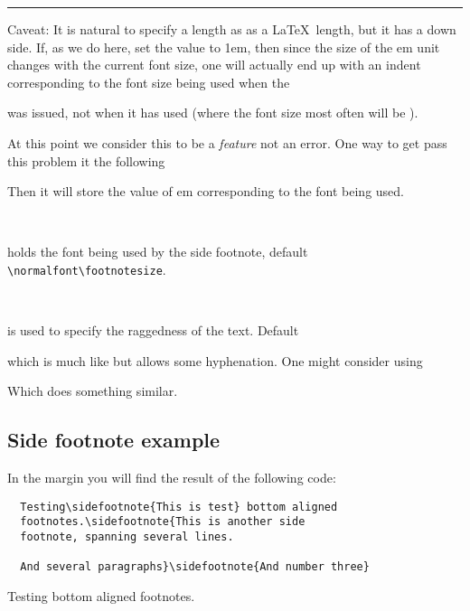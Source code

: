 \fancybreak{}

Caveat: It is natural to specify a length as \lnc{\sidefootparindent}
as a \LaTeX\ length, but it has a down side. If, as we do here, set
the value to 1em, then since the size of the em unit changes with the
current font size, one will actually end up with an indent
corresponding to the font size being used when the
\begin{lcode}
  \setlength{\sidefootparindent}{1em}
\end{lcode}
was issued, not when it has used (where the font size most often will
be \cmd{\footnotesize}).

At this point we consider this to be a \emph{feature} not an
error. One way to get pass this problem it the following
\begin{lcode}
\begingroup%
\sidefoottextfont
\global\setlength\sidefootparindent{1em}
\endgroup  
\end{lcode}
Then it will store the value of em corresponding to the font being
used. 


\begin{syntax}
  \cmd{\sidefoottextfont}\\
\end{syntax}
holds the font being used by the side footnote, default
\verb+\normalfont\footnotesize+. 
\begin{syntax}
  \cmd{\sidefootform}\\
\end{syntax}
is used to specify the raggedness of the text. Default
\begin{lcode}
  \newcommand*{\sidefootform}{\rightskip=\z@ \@plus 2em}
\end{lcode}
which is much like  but allows some hyphenation. One
might consider using
\begin{lcode}
  \usepackage{ragged2e}
  \newcommand*{\sidefootform}{\RaggedRight}
\end{lcode}
Which does something similar.





\subsection{Side footnote example}
\label{sec:side-footn-example}



In the margin you will find the result of the following code:
\begin{verbatim}
  Testing\sidefootnote{This is test} bottom aligned
  footnotes.\sidefootnote{This is another side 
  footnote, spanning several lines.

  And several paragraphs}\sidefootnote{And number three}
\end{verbatim}
  Testing bottom aligned
  footnotes.


